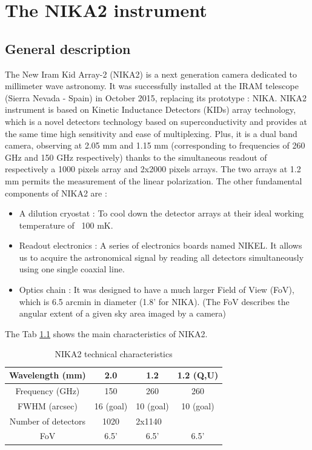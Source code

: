 \documentclass[english,11pt]{report}
\begin{document}

\tableofcontents

\chapter{The NIKA2 instrument}
	\section{General description}
	
The New Iram Kid Array-2 (NIKA2) is a next generation camera dedicated to millimeter wave astronomy. It was successfully installed at the IRAM telescope (Sierra Nevada - Spain) in October 2015, replacing its prototype : NIKA. NIKA2 instrument is based on Kinetic Inductance Detectors (KIDs) array technology, which is a novel detectors technology based on superconductivity and provides at the same time high sensitivity and ease of multiplexing. Plus, it is a dual band camera, observing at 2.05 mm and 1.15 mm (corresponding to frequencies of 260 GHz and 150 GHz respectively) thanks to the simultaneous readout of respectively a 1000 pixels array and 2x2000 pixels arrays. The two arrays at 1.2 mm permits the measurement of the linear polarization. The other fundamental components of NIKA2 are : \\

\begin{itemize}
\item A dilution cryostat : To cool down the detector arrays at their ideal working temperature of ~100 mK.
\item Readout electronics : A series of electronics boards named NIKEL. It allows us to acquire the astronomical signal by reading all detectors simultaneously using one single coaxial line.
\item Optics chain : It was designed to have a much larger Field of View (FoV), which is 6.5 arcmin in diameter (1.8' for NIKA). (The FoV describes the angular extent of a given sky area imaged by a camera) \\
\end{itemize}

The Tab \ref{NIKA2} shows the main characteristics of NIKA2.

 \begin{table}[h!]
\center
\begin{tabular}{|c|c|c|c}
  \hline
Wavelength (mm) & 2.0 & 1.2 & 1.2 (Q,U)  \\
	\hline
 Frequency (GHz) & 150 & 260 & 260 \\
  \hline
 FWHM (arcsec)  & 16 (goal) & 10 (goal) & 10 (goal) \\
  \hline
 Number of detectors & 1020 & \multicolumn{2}{l|}{2x1140}  \\
 \hline
 FoV  & 6.5' & 6.5' & 6.5' \\
  \hline
\end{tabular} 

\caption{NIKA2 technical characteristics}
 \label{NIKA2}
\end{table}
\end{document}
